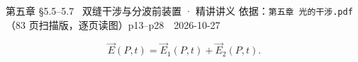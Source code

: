\documentclass[11pt]{ctexart}
\begin{document}
%
{第五章 \S5.5--5.7 \ 双缝干涉与分波前装置 · 精讲讲义}%
{依据：\texttt{第五章 光的干涉.pdf}（83 页扫描版，逐页读图）p13--p28\ \textbar\ 2026-10-27}

\[
\vec{E}(P,t)=\vec{E}_1(P,t)+\vec{E}_2(P,t).
\]
\end{document}

